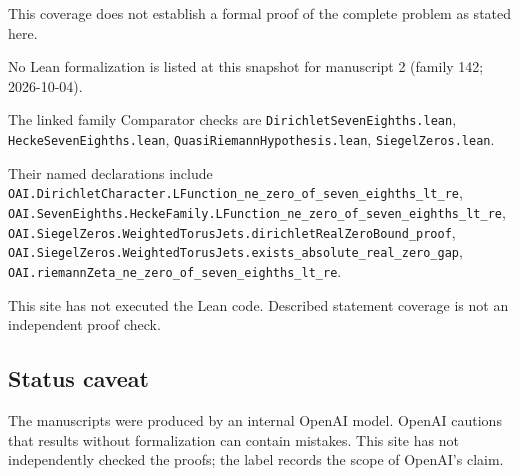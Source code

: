 \documentclass[11pt]{article}
\begin{document}
This coverage does not establish a formal proof of the complete problem as stated here.

No Lean formalization is listed at this snapshot for manuscript 2 (family 142; 2026-10-04).

The linked family Comparator checks are \texttt{DirichletSevenEighths.lean}, \texttt{HeckeSevenEighths.lean}, \texttt{QuasiRiemannHypothesis.lean}, \texttt{SiegelZeros.lean}.

Their named declarations include \texttt{OAI.DirichletCharacter.LFunction\_ne\_zero\_of\_seven\_eighths\_lt\_re}, \texttt{OAI.SevenEighths.HeckeFamily.LFunction\_ne\_zero\_of\_seven\_eighths\_lt\_re}, \texttt{OAI.SiegelZeros.WeightedTorusJets.dirichletRealZeroBound\_proof}, \texttt{OAI.SiegelZeros.WeightedTorusJets.exists\_absolute\_real\_zero\_gap}, \texttt{OAI.riemannZeta\_ne\_zero\_of\_seven\_eighths\_lt\_re}.

This site has not executed the Lean code. Described statement coverage is not an independent proof check.

\subsection{Status caveat}
The manuscripts were produced by an internal OpenAI model. OpenAI cautions that results without formalization can contain mistakes. This site has not independently checked the proofs; the label records the scope of OpenAI's claim.
\end{document}
